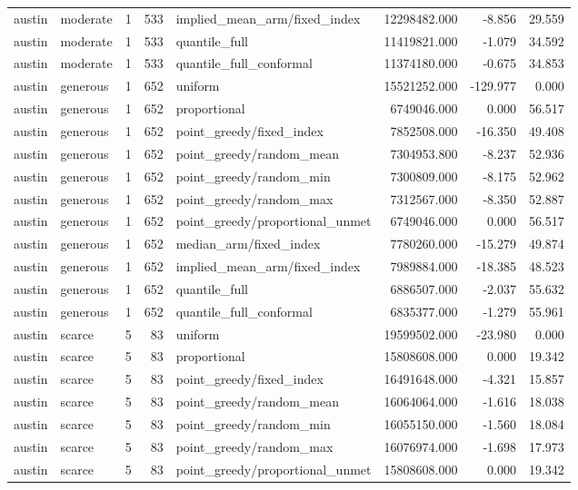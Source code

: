 \begin{tabular}{llrrlrrr}
austin & moderate & 1 & 533 & implied\_mean\_arm/fixed\_index & 12298482.000 & -8.856 & 29.559 \\
austin & moderate & 1 & 533 & quantile\_full & 11419821.000 & -1.079 & 34.592 \\
austin & moderate & 1 & 533 & quantile\_full\_conformal & 11374180.000 & -0.675 & 34.853 \\
austin & generous & 1 & 652 & uniform & 15521252.000 & -129.977 & 0.000 \\
austin & generous & 1 & 652 & proportional & 6749046.000 & 0.000 & 56.517 \\
austin & generous & 1 & 652 & point\_greedy/fixed\_index & 7852508.000 & -16.350 & 49.408 \\
austin & generous & 1 & 652 & point\_greedy/random\_mean & 7304953.800 & -8.237 & 52.936 \\
austin & generous & 1 & 652 & point\_greedy/random\_min & 7300809.000 & -8.175 & 52.962 \\
austin & generous & 1 & 652 & point\_greedy/random\_max & 7312567.000 & -8.350 & 52.887 \\
austin & generous & 1 & 652 & point\_greedy/proportional\_unmet & 6749046.000 & 0.000 & 56.517 \\
austin & generous & 1 & 652 & median\_arm/fixed\_index & 7780260.000 & -15.279 & 49.874 \\
austin & generous & 1 & 652 & implied\_mean\_arm/fixed\_index & 7989884.000 & -18.385 & 48.523 \\
austin & generous & 1 & 652 & quantile\_full & 6886507.000 & -2.037 & 55.632 \\
austin & generous & 1 & 652 & quantile\_full\_conformal & 6835377.000 & -1.279 & 55.961 \\
austin & scarce & 5 & 83 & uniform & 19599502.000 & -23.980 & 0.000 \\
austin & scarce & 5 & 83 & proportional & 15808608.000 & 0.000 & 19.342 \\
austin & scarce & 5 & 83 & point\_greedy/fixed\_index & 16491648.000 & -4.321 & 15.857 \\
austin & scarce & 5 & 83 & point\_greedy/random\_mean & 16064064.000 & -1.616 & 18.038 \\
austin & scarce & 5 & 83 & point\_greedy/random\_min & 16055150.000 & -1.560 & 18.084 \\
austin & scarce & 5 & 83 & point\_greedy/random\_max & 16076974.000 & -1.698 & 17.973 \\
austin & scarce & 5 & 83 & point\_greedy/proportional\_unmet & 15808608.000 & 0.000 & 19.342 \\

\end{tabular}
